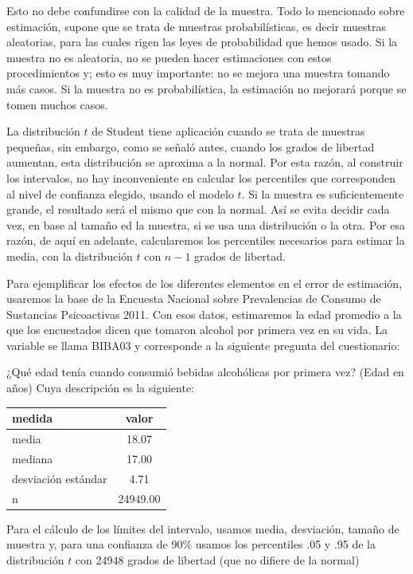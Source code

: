 \documentclass[]{book}
\begin{document}
Esto no debe confundirse con la calidad de la muestra. Todo lo
mencionado sobre estimación, supone que se trata de muestras
probabilísticas, es decir muestras aleatorias, para las cuales rigen las leyes de probabilidad que hemos usado. Si la muestra no es aleatoria, no se pueden hacer estimaciones con estos procedimientos y; esto es muy importante: no se mejora una muestra tomando más casos. Si la muestra no es probabilística, la estimación no mejorará porque se tomen muchos casos.

La distribución \(t\) de Student tiene aplicación cuando se trata de muestras pequeñas, sin embargo, como se señaló antes, cuando los grados de libertad aumentan, esta distribución se aproxima a la normal. Por esta razón, al construir los intervalos, no hay inconveniente en calcular los percentiles que corresponden al nivel de confianza elegido, usando el modelo \(t\). Si la muestra es suficientemente grande, el resultado será el mismo que con la normal. Así se evita decidir cada vez, en base al tamaño ed la muestra, si se usa una distribución o la otra. Por esa razón, de aquí en adelante, calcularemos los percentiles necesarios para estimar la media, con la distribución \(t\) con \(n-1\) grados de libertad.

Para ejemplificar los efectos de los diferentes elementos en el error de
estimación, usaremos la base de la Encuesta Nacional sobre Prevalencias de Consumo de Sustancias Psicoactivas 2011. Con esos datos, estimaremos la edad promedio a la que los encuestados dicen que tomaron alcohol por primera vez en su vida. La variable se llama BIBA03 y corresponde a la siguiente pregunta del cuestionario:

¿Qué edad tenía cuando consumió bebidas alcohólicas por primera vez?
(Edad en años)
Cuya descripción es la siguiente:

\begin{table}[H]
\centering
\begin{tabular}{lc}
\toprule
medida & valor\\
\midrule
\rowcolor{gray!6}  media & 18.07\\
mediana & 17.00\\
\rowcolor{gray!6}  desviación estándar & 4.71\\
n & 24949.00\\
\bottomrule
\end{tabular}
\end{table}

Para el cálculo de los límites del intervalo, usamos media, desviación, tamaño de muestra y, para una confianza de 90\% usamos los percentiles .05 y .95 de la distribución \(t\) con 24948 grados de libertad (que no difiere de la normal)
\end{document}
